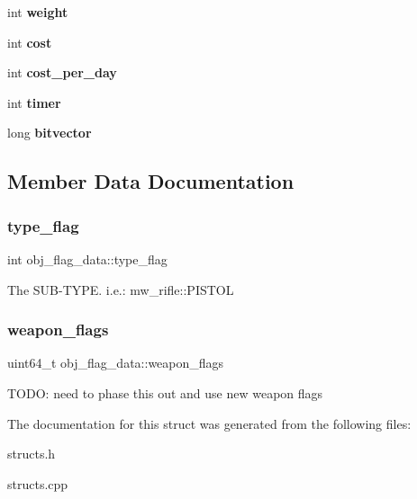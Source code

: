 \begin{DoxyCompactItemize}
int {\bfseries weight}
\item 
\mbox{\label{structobj__flag__data_a2459c07a796095c5e5c32e068ab73b2e}} 
int {\bfseries cost}
\item 
\mbox{\label{structobj__flag__data_a164f8058705c1197aed834bf652915bb}} 
int {\bfseries cost\+\_\+per\+\_\+day}
\item 
\mbox{\label{structobj__flag__data_a20a5b10d79ee5e904e6c35beaced113f}} 
int {\bfseries timer}
\item 
\mbox{\label{structobj__flag__data_a9fc43403ff7a9e0ab701937e64e42263}} 
long {\bfseries bitvector}
\end{DoxyCompactItemize}


\subsection{Member Data Documentation}
\mbox{\label{structobj__flag__data_a55ccb1667f408f5b1c5a9171efde9f12}} 
\subsubsection{\texorpdfstring{type\+\_\+flag}{type\_flag}}
{\footnotesize\ttfamily int obj\+\_\+flag\+\_\+data\+::type\+\_\+flag}

The S\+U\+B-\/\+T\+Y\+PE. i.\+e.\+: mw\+\_\+rifle\+::\+P\+I\+S\+T\+OL \mbox{\label{structobj__flag__data_ad14afe5bec168b64c8e51a41b07bc0e8}} 
\subsubsection{\texorpdfstring{weapon\+\_\+flags}{weapon\_flags}}
{\footnotesize\ttfamily uint64\+\_\+t obj\+\_\+flag\+\_\+data\+::weapon\+\_\+flags}

T\+O\+DO\+: need to phase this out and use new weapon flags 

The documentation for this struct was generated from the following files\+:\begin{DoxyCompactItemize}
\item 
structs.\+h\item 
structs.\+cpp\end{DoxyCompactItemize}
